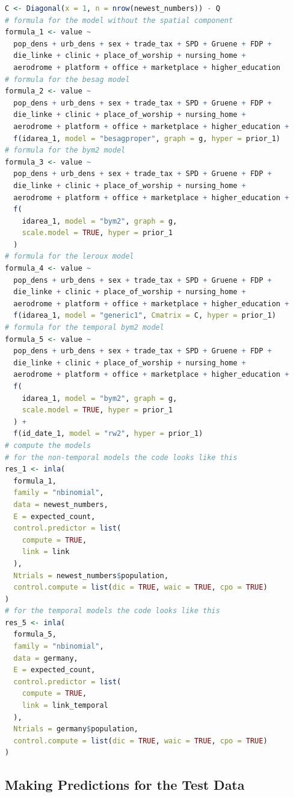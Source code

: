 \begin{lstlisting}[caption={Specifying different models in INLA.}, label={codeModels}, language=R]
C <- Diagonal(x = 1, n = nrow(newest_numbers)) - Q
# formula for the model without the spatial component
formula_1 <- value ~
  pop_dens + urb_dens + sex + trade_tax + SPD + Gruene + FDP +
  die_linke + clinic + place_of_worship + nursing_home +
  aerodrome + platform + office + marketplace + higher_education
# formula for the besag model
formula_2 <- value ~
  pop_dens + urb_dens + sex + trade_tax + SPD + Gruene + FDP +
  die_linke + clinic + place_of_worship + nursing_home +
  aerodrome + platform + office + marketplace + higher_education +
  f(idarea_1, model = "besagproper", graph = g, hyper = prior_1)
# formula for the bym2 model
formula_3 <- value ~
  pop_dens + urb_dens + sex + trade_tax + SPD + Gruene + FDP +
  die_linke + clinic + place_of_worship + nursing_home +
  aerodrome + platform + office + marketplace + higher_education +
  f(
    idarea_1, model = "bym2", graph = g,
    scale.model = TRUE, hyper = prior_1
  )
# formula for the leroux model
formula_4 <- value ~
  pop_dens + urb_dens + sex + trade_tax + SPD + Gruene + FDP +
  die_linke + clinic + place_of_worship + nursing_home +
  aerodrome + platform + office + marketplace + higher_education +
  f(idarea_1, model = "generic1", Cmatrix = C, hyper = prior_1)
# formula for the temporal bym2 model
formula_5 <- value ~
  pop_dens + urb_dens + sex + trade_tax + SPD + Gruene + FDP +
  die_linke + clinic + place_of_worship + nursing_home +
  aerodrome + platform + office + marketplace + higher_education +
  f(
    idarea_1, model = "bym2", graph = g,
    scale.model = TRUE, hyper = prior_1
  ) +
  f(id_date_1, model = "rw2", hyper = prior_1)
# compute the models
# for the non-temporal models the code looks like this
res_1 <- inla(
  formula_1,
  family = "nbinomial",
  data = newest_numbers,
  E = expected_count,
  control.predictor = list(
    compute = TRUE,
    link = link
  ),
  Ntrials = newest_numbers$population,
  control.compute = list(dic = TRUE, waic = TRUE, cpo = TRUE)
)
# for the temporal models the code looks like this
res_5 <- inla(
  formula_5,
  family = "nbinomial",
  data = germany,
  E = expected_count,
  control.predictor = list(
    compute = TRUE,
    link = link_temporal
  ),
  Ntrials = germany$population,
  control.compute = list(dic = TRUE, waic = TRUE, cpo = TRUE)
)
\end{lstlisting}
\subsection{Making Predictions for the Test Data}
\begin{lstlisting}[caption={The code for making predictions in INLA.}, label={codePrediction}, language=R]
\end{lstlisting}
